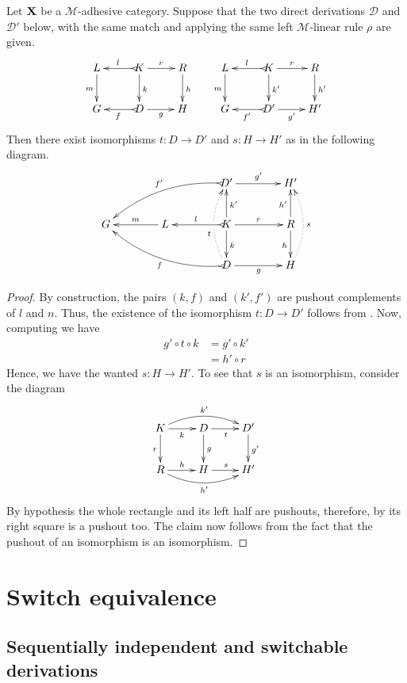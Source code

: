 \documentclass[a4paper,UKenglish,cleveref,pdftex, thm-restate,numberwithinsect]{lipics}
\def\X{\textbf {\textup{X}}}
\begin{document}
\begin{proposition}\label{prop:unique} Let $\X$  be a $\mathcal{M}$-adhesive category. Suppose that the two direct derivations $\mathscr{D}$ and $\mathscr{D'}$ below, with the same match and applying the same left $\mathcal{M}$-linear rule $\rho$ are given.
	\[\xymatrix{L \ar[d]_{m}& K \ar[d]^{k}\ar@{>->}[l]_{l} \ar[r]^{r} & R \ar[d]^{h} & L \ar[d]_{m}& K \ar[d]^{k'}\ar@{>->}[l]_{l} \ar[r]^{r} & R \ar[d]^{h'}\\G & \ar@{>->}[l]^{f} D \ar[r]_{g}& H & G & \ar@{>->}[l]^{f'} D' \ar[r]_{g'}& H'}\]
	Then there exist isomorphisms $t\colon D\to D'$ and $s\colon H\to H'$ as in the following diagram.
	\[\xymatrix@C=40pt{&&D' \ar[r]^{g'} \ar@{>->}@/_.45cm/[dll]_{f'}&H'\\G & L \ar[l]_{m} & K \ar[u]_{k'} \ar[d]^{k}\ar[r]^{r} \ar@{>->}[l]_{l} &R\ar[u]^{h'} \ar[d]_{h}\\&&D\ar@{>->}@/^.45cm/[ull]^{f}\ar@/^.4cm/@{.>}[uu]^(.4){t}|\hole \ar[r]_{g}&H\ar@/_.4cm/@{.>}[uu]_{s}}\]
\end{proposition}
\begin{proof}
	By construction, the pairs $(k, f)$ and $(k', f')$ are pushout complements of $l$ and $n$. Thus, the existence of the isomorphism $t\colon D\to D'$ follows from . Now, computing we have
	\begin{align*}
		g'\circ t \circ k &= g' \circ k'\\&=h'\circ r
	\end{align*}
	Hence, we have the wanted $s\colon H\to H'$. To see that $s$ is an isomorphism, consider the diagram 
	\[\xymatrix{K  \ar@/^.4cm/[rr]^{k'}\ar[d]_{r} \ar[r]_{k}& \ar[r]_{t} D \ar[d]^{g}& D' \ar[d]^{g'}\\ R \ar@/_.4cm/[rr]_{h'} \ar[r]^{h}& H \ar[r]^{s}& H'}\]
	By hypothesis the whole rectangle and its left half are pushouts, therefore, by  its right square is a pushout too. The claim now follows from the fact that the pushout of an isomorphism is an isomorphism.
\end{proof}

\section{Switch equivalence }\label{sec:equi}



\subsection{Sequentially independent and switchable derivations }
\end{document}
